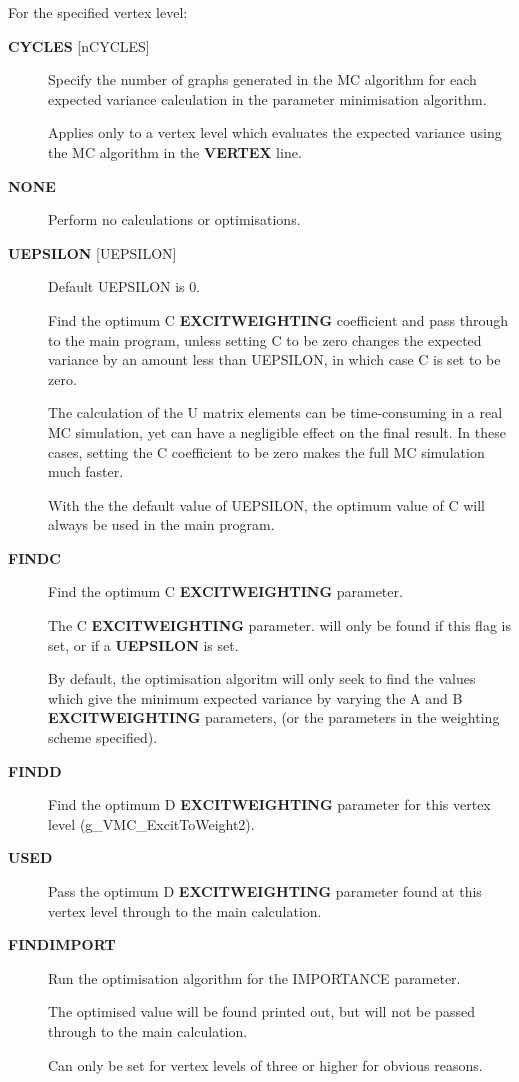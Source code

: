 \documentclass[openany,a4paper,10pt]{manual}
\begin{document}
For the specified vertex level:
\begin{description}
\item[\textbf{CYCLES} {[}nCYCLES{]}]
Specify the number of graphs generated in the MC algorithm
for each expected variance calculation in the parameter minimisation algorithm.

Applies only to a vertex level which evaluates the expected variance
using the MC algorithm in the \textbf{VERTEX} line.

\item[\textbf{NONE}]
Perform no calculations or optimisations.

\item[\textbf{UEPSILON} {[}UEPSILON{]}]
Default UEPSILON is 0.

Find the  optimum C \textbf{EXCITWEIGHTING} coefficient and pass through to the main program,
unless setting C to be zero changes the expected variance by an amount less
than UEPSILON, in which case C is set to be zero.

The calculation of the U matrix elements can be time-consuming
in a real MC simulation, yet can have a negligible effect on the
final result.  In these cases, setting the C coefficient to be zero
makes the full MC simulation much faster.

With the the default value of UEPSILON, the optimum value of C will
always be used in the main program.

\item[\textbf{FINDC}]
Find the optimum C \textbf{EXCITWEIGHTING} parameter.

The C \textbf{EXCITWEIGHTING} parameter. will only be found if this
flag is set, or if a \textbf{UEPSILON} is set.

By default, the optimisation algoritm will only seek to find the
values which give the minimum expected variance by varying the A and
B \textbf{EXCITWEIGHTING} parameters, (or the parameters in the weighting
scheme specified).

\item[\textbf{FINDD}]
Find the optimum D \textbf{EXCITWEIGHTING} parameter for this vertex
level (g\_VMC\_ExcitToWeight2).

\item[\textbf{USED}]
Pass the optimum D \textbf{EXCITWEIGHTING} parameter found at this vertex level
through to the main calculation.

\item[\textbf{FINDIMPORT}]
Run the optimisation algorithm for the IMPORTANCE
parameter.

The optimised value will be found printed out,
but will not be passed through to the main calculation.

Can only be set for vertex levels of three or higher for
obvious reasons.

\end{description}
\end{document}
